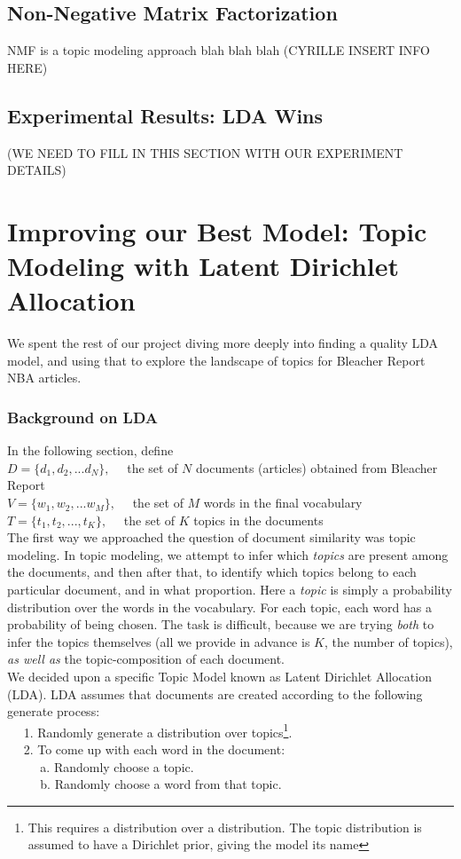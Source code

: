 \documentclass[11pt]{article}
\begin{document}
\subsection{Non-Negative Matrix Factorization}
NMF is a topic modeling approach blah blah blah
(CYRILLE INSERT INFO HERE)

\subsection{Experimental Results: LDA Wins}
(WE NEED TO FILL IN THIS SECTION WITH OUR EXPERIMENT DETAILS)




\section{Improving our Best Model: Topic Modeling with Latent Dirichlet Allocation}
We spent the rest of our project diving more deeply into finding a quality LDA model, and using that to explore the landscape of topics for Bleacher Report NBA articles. 

\subsubsection{Background on LDA}
In the following section, define \\
$D = \{d_1, d_2, ... d_N \}, \quad$ the set of $N$ documents (articles) obtained from Bleacher Report \\
$V = \{w_1, w_2, ... w_M \}, \quad$ the set of $M$ words in the final vocabulary \\
$T = \{t_1, t_2, ..., t_K\}, \quad$ the set of $K$ topics in the documents \\

The first way we approached the question of document similarity was topic modeling.  In topic modeling, we attempt to infer which \textit{topics} are present among the documents, and then after that, to identify which topics belong to each particular document, and in what proportion.  Here a \textit{topic} is simply a probability distribution over the words in the vocabulary.  For each topic, each word has a probability of being chosen.  The task is difficult, because we are trying \textit{both} to infer the topics themselves (all we provide in advance is $K$, the number of topics), \textit{as well as} the topic-composition of each document. \\

We decided upon a specific Topic Model known as Latent Dirichlet Allocation (LDA). LDA assumes that documents are created according to the following generate process: \\
$\text{} \quad$ 1. Randomly generate a distribution over topics\footnote{This requires a distribution over a distribution. The  topic distribution is assumed to have a Dirichlet prior, giving the model its name}. \\
$\text{} \quad$ 2. To come up with each word in the document: \\
$\text{} \quad$ $\quad$ a. Randomly choose a topic. \\
$\text{} \quad$ $\quad$ b. Randomly choose a word from that topic.  \\
\end{document}
